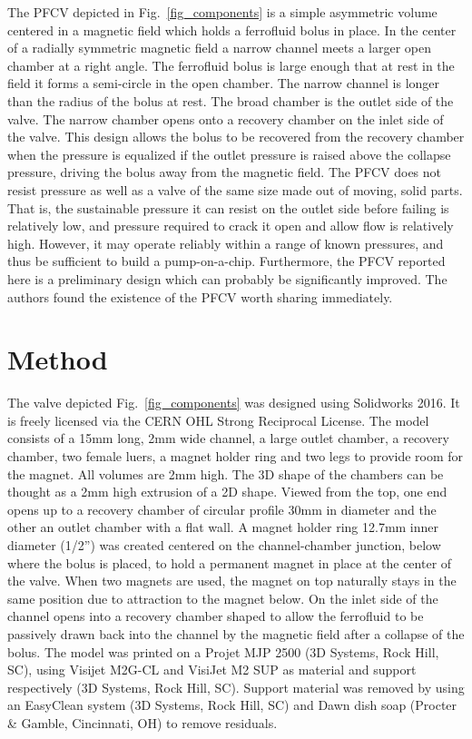 \documentclass[]{asme2ej}
\begin{document}
The PFCV depicted in Fig.~\ref{fig_components} is a simple asymmetric volume
centered in a magnetic field
which holds a ferrofluid bolus in place.
In the center of a radially symmetric magnetic field
a narrow channel meets a larger open chamber at a right angle.
The ferrofluid bolus is large enough that at rest in the field it
forms a semi-circle in the open chamber. The narrow channel is
longer than the radius of the bolus at rest.
The broad chamber is the outlet side of the valve.
The narrow chamber opens onto a recovery chamber on the inlet
side of the valve.
This design allows the bolus to be recovered from the recovery
chamber when the pressure is equalized if the outlet pressure is
raised above the collapse pressure, driving the bolus away
from the magnetic field.
The PFCV does not resist pressure as well  as a
valve of the same size
made out of moving, solid parts.
That is, the sustainable
pressure it can resist on the outlet side before failing is relatively
low, and pressure required to crack it open and allow flow is
relatively high.
However, it may operate reliably within a range of
known pressures, and thus be sufficient to build a
pump-on-a-chip.
Furthermore, the PFCV reported here is a preliminary design which
can probably be significantly improved.
The authors found the
existence of the PFCV worth sharing immediately.

\section{Method}

The valve depicted Fig.~\ref{fig_components}
was designed using Solidworks 2016.
It is freely licensed via the CERN OHL Strong Reciprocal License\cite{stuckey2021,stuckey2021stl}.
The model consists of a 15mm long, 2mm wide channel, a large outlet
chamber, a recovery chamber,
two female luers, a magnet holder ring and two legs to provide room
for the magnet.  All volumes are 2mm high.
The 3D shape
of the chambers can be thought as a 2mm high extrusion of a 2D shape.
Viewed from the top, one end opens up to a recovery
chamber of circular profile 30mm in diameter and the other
an outlet chamber with a flat wall.
A magnet holder ring 12.7mm inner diameter (1/2'') was created centered on the channel-chamber
junction, below where the bolus is placed, to hold a permanent magnet in place
at the center of the valve. When two magnets are used, the magnet on
top naturally stays in the same position due to attraction to the magnet below.
On the inlet side of the channel
opens into a recovery chamber shaped to allow the ferrofluid to be
passively drawn back into the channel by the magnetic field after a
collapse of the bolus.
The model was printed on a Projet MJP 2500 (3D
Systems, Rock Hill, SC), using Visijet M2G-CL and VisiJet M2 SUP as
material and support respectively (3D Systems, Rock Hill, SC). Support
material was removed by using an EasyClean system (3D Systems, Rock
Hill, SC) and Dawn dish soap (Procter \& Gamble, Cincinnati, OH) to
remove residuals.
\end{document}
